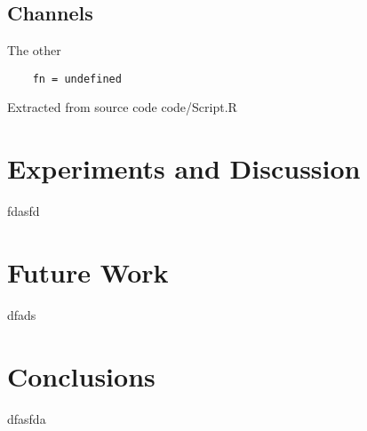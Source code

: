 \documentclass[12pt]{article}
\begin{document}
\subsection{Channels}
The other 


\begin{listing}[H]
\begin{verbatim}
    fn = undefined
    \end{verbatim}
    \caption{Extracted from source code code/Script.R}
    \label{src:haskell:1}
\end{listing}


\section{Experiments and Discussion}
fdasfd

\section{Future Work}
dfads

\section{Conclusions}
dfasfda

\clearpage

\printglossary[type=\acronymtype]

\printglossary




\appendix
\end{document}
